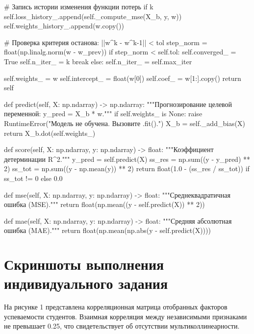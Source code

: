\documentclass[14pt,a4paper]{extarticle}
\begin{document}
\begin{CodeListing}
            # Запись истории изменения функции потерь
            if k %
                self.loss_history_.append(self._compute_mse(X_b, y, w))
                self.weights_history_.append(w.copy())

            # Проверка критерия останова: ||w^k - w^{k-1}|| < tol
            step_norm = float(np.linalg.norm(w - w_prev))
            if step_norm < self.tol:
                self.converged_ = True
                self.n_iter_ = k
                break
        else:
            self.n_iter_ = self.max_iter

        self.weights_ = w
        self.intercept_ = float(w[0])
        self.coef_ = w[1:].copy()
        return self

    def predict(self, X: np.ndarray) -> np.ndarray:
        """Прогнозирование целевой переменной: y_pred = X_b * w."""
        if self.weights_ is None:
            raise RuntimeError("Модель не обучена. Вызовите .fit().")
        X_b = self._add_bias(X)
        return X_b.dot(self.weights_)

    def score(self, X: np.ndarray, y: np.ndarray) -> float:
        """Коэффициент детерминации R^2."""
        y_pred = self.predict(X)
        ss_res = np.sum((y - y_pred) ** 2)
        ss_tot = np.sum((y - np.mean(y)) ** 2)
        return float(1.0 - (ss_res / ss_tot)) if ss_tot != 0 else 0.0

    def mse(self, X: np.ndarray, y: np.ndarray) -> float:
        """Среднеквадратичная ошибка (MSE)."""
        return float(np.mean((y - self.predict(X)) ** 2))

    def mae(self, X: np.ndarray, y: np.ndarray) -> float:
        """Средняя абсолютная ошибка (MAE)."""
        return float(np.mean(np.abs(y - self.predict(X))))
\end{CodeListing}

\section{Скриншоты выполнения индивидуального задания}

На рисунке 1 представлена корреляционная матрица отобранных факторов успеваемости студентов. Взаимная корреляция между независимыми признаками не превышает 0.25, что свидетельствует об отсутствии мультиколлинеарности.
\end{document}
